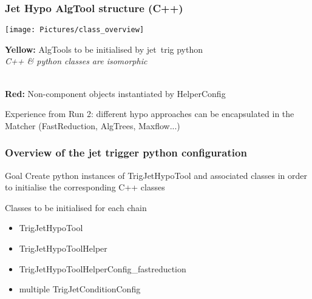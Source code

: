 \documentclass{beamer}
\begin{document}
\frame 
 {
 \frametitle{Jet Hypo AlgTool structure (C++)}
   \begin{block}{}
      \begin{minipage}[T]{0.75\linewidth}
   \texttt{[image: Pictures/class\_overview]}
   \end{minipage}%
         \begin{minipage}[T]{0.25\linewidth}
         \begin{small}
          {\bf Yellow:} AlgTools to be initialised by jet~trig python\\
          {\it C++ \& python classes are isomorphic}
          
          \hrulefill\\
          {\bf Red:} Non-component objects instantiated by HelperConfig
          \end{small}
           \end{minipage}
   \end{block}   
   \begin{block}{}
   Experience from Run 2:  different hypo approaches can be encapsulated in the Matcher (FastReduction, AlgTrees, Maxflow...)
   \end{block}
}

\frame 
 {
 \frametitle{Overview of the jet trigger python configuration}
 \begin{block}{Goal}
 Create python instances of TrigJetHypoTool and associated classes in order to initialise the  corresponding C++ classes
  \end{block}
  \begin{block}{Classes to be initialised for each chain}
  \begin{itemize}
  \item TrigJetHypoTool
  \item TrigJetHypoToolHelper
  \item TrigJetHypoToolHelperConfig\_fastreduction
  \item multiple TrigJetConditionConfig
  \end{itemize}


  \end{block}
  
}

\end{document}
